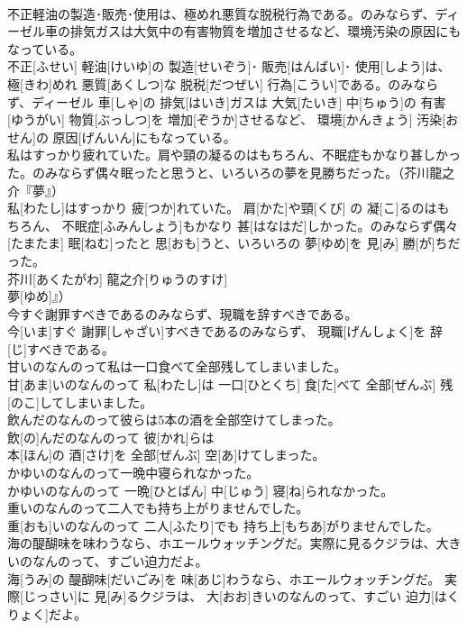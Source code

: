 \documentclass[8pt]{extreport}
\begin{document}
\begin{CJK}{UTF8}{min}
\\	不正軽油の製造･販売･使用は、極めれ悪質な脱税行為である。のみならず、ディーゼル車の排気ガスは大気中の有害物質を増加させるなど、環境汚染の原因にもなっている。	
\\	不正[ふせい] 軽油[けいゆ]の 製造[せいぞう]･ 販売[はんばい]･ 使用[しよう]は、 極[きわ]めれ 悪質[あくしつ]な 脱税[だつぜい] 行為[こうい]である。のみならず、ディーゼル 車[しゃ]の 排気[はいき]ガスは 大気[たいき] 中[ちゅう]の 有害[ゆうがい] 物質[ぶっしつ]を 増加[ぞうか]させるなど、 環境[かんきょう] 汚染[おせん]の 原因[げんいん]にもなっている。
\\	私はすっかり疲れていた。肩や頸の凝るのはもちろん、不眠症もかなり甚しかった。のみならず偶々眠ったと思うと、いろいろの夢を見勝ちだった。（芥川龍之介『夢』）	
\\	私[わたし]はすっかり 疲[つか]れていた。 肩[かた]や頸[くび] の 凝[こ]るのはもちろん、 不眠症[ふみんしょう]もかなり 甚[はなはだ]しかった。のみならず偶々[たまたま] 眠[ねむ]ったと 思[おも]うと、いろいろの 夢[ゆめ]を 見[み] 勝[が]ちだった。
\\	芥川[あくたがわ] 龍之介[りゅうのすけ]
\\	夢[ゆめ]』）
\\	今すぐ謝罪すべきであるのみならず、現職を辞すべきである。	
\\	今[いま]すぐ 謝罪[しゃざい]すべきであるのみならず、 現職[げんしょく]を 辞[じ]すべきである。
\\	甘いのなんのって私は一口食べて全部残してしまいました。	
\\	甘[あま]いのなんのって 私[わたし]は 一口[ひとくち] 食[た]べて 全部[ぜんぶ] 残[のこ]してしまいました。
\\	飲んだのなんのって彼らは5本の酒を全部空けてしまった。	
\\	飲[の]んだのなんのって 彼[かれ]らは 
\\	本[ほん]の 酒[さけ]を 全部[ぜんぶ] 空[あ]けてしまった。
\\	かゆいのなんのって一晩中寝られなかった。	
\\	かゆいのなんのって 一晩[ひとばん] 中[じゅう] 寝[ね]られなかった。
\\	重いのなんのって二人でも持ち上がりませんでした。	
\\	重[おも]いのなんのって 二人[ふたり]でも 持ち上[もちあ]がりませんでした。
\\	海の醍醐味を味わうなら、ホエールウォッチングだ。実際に見るクジラは、大きいのなんのって、すごい迫力だよ。	
\\	海[うみ]の 醍醐味[だいごみ]を 味[あじ]わうなら、ホエールウォッチングだ。 実際[じっさい]に 見[み]るクジラは、 大[おお]きいのなんのって、すごい 迫力[はくりょく]だよ。

\end{CJK}
\end{document}
